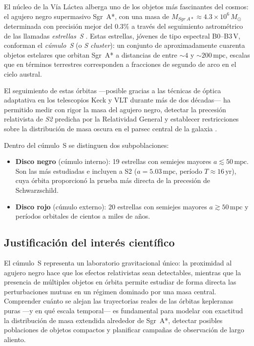 \documentclass[12pt,a4paper]{article}
\newcommand{\SgrA}{Sgr~A*}
\newcommand{\Msol}{M_{\odot}}
\newcommand{\mpc}{\text{mpc}}
\newcommand{\yr}{\text{yr}}
\begin{document}
El núcleo de la Vía Láctea alberga uno de los objetos más fascinantes del cosmos: el
agujero negro supermasivo \SgrA{}, con una masa de
$M_{\SgrA} \approx 4.3 \times 10^{6}\,\Msol$ determinada con precisión mejor del
$0.3\%$ a través del seguimiento astrométrico de las llamadas \emph{estrellas~S}
\citep{gillessen2017update, ciurlo2025sagittarius}.  Estas estrellas, jóvenes de tipo
espectral B0--B3\,V, conforman el \emph{cúmulo~S} (o \emph{S cluster}): un conjunto
de aproximadamente cuarenta objetos estelares que orbitan \SgrA{} a distancias de
entre $\sim 4$ y $\sim 200\,\mpc$, escalas que en términos terrestres corresponden
a fracciones de segundo de arco en el cielo austral.

El seguimiento de estas órbitas —posible gracias a las técnicas de óptica adaptativa
en los telescopios Keck y VLT durante más de dos décadas— ha permitido medir con
rigor la masa del agujero negro, detectar la precesión relativista de \emph{S2}
predicha por la Relatividad General y establecer restricciones sobre la distribución
de masa oscura en el parsec central de la galaxia
\citep{gillessen2017update, ali2020kinematic}.

Dentro del cúmulo~S se distinguen dos subpoblaciones:
\begin{itemize}[itemsep=2pt]
  \item \textbf{Disco negro} (cúmulo interno): 19 estrellas con semiejes mayores
    $a \lesssim 50\,\mpc$.  Son las más estudiadas e incluyen a S2 ($a = 5.03\,\mpc$,
    período $T \approx 16\,\yr$), cuya órbita proporcionó la prueba más directa de la
    precesión de Schwarzschild.
  \item \textbf{Disco rojo} (cúmulo externo): 20 estrellas con semiejes mayores
    $a \gtrsim 50\,\mpc$ y períodos orbitales de cientos a miles de años.
\end{itemize}

\subsection{Justificación del interés científico}
\label{subsec:justificacion}

El cúmulo~S representa un laboratorio gravitacional único: la proximidad al agujero
negro hace que los efectos relativistas sean detectables, mientras que la presencia de
múltiples objetos en órbita permite estudiar de forma directa las perturbaciones
mutuas en un régimen dominado por una masa central.  Comprender cuánto se alejan las
trayectorias reales de las órbitas kepleranas puras —y en qué escala temporal— es
fundamental para modelar con exactitud la distribución de masa extendida alrededor de
\SgrA{}, detectar posibles poblaciones de objetos compactos y planificar campañas de
observación de largo aliento.
\end{document}
